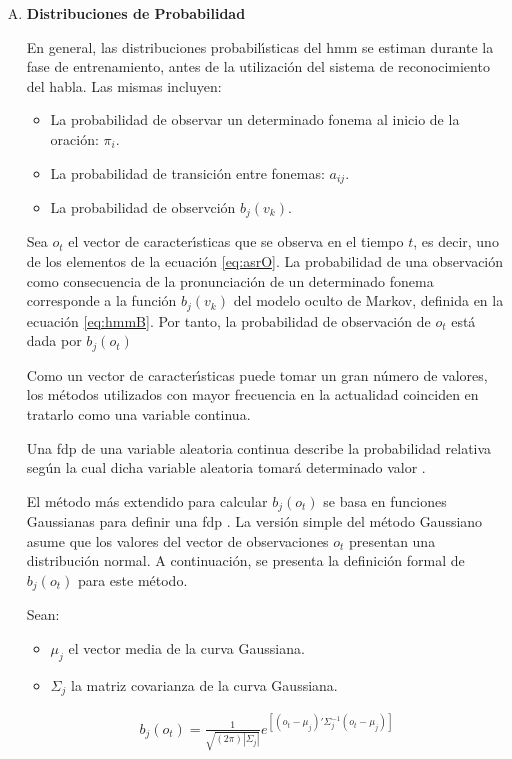 \begin{enumerate}[A)]
	\item \textbf{Distribuciones de Probabilidad}


	En general, las distribuciones probabil{\'\i}sticas del \gls{hmm} se estiman durante la fase de entrenamiento,
	antes de la utilizaci\'on del sistema de reconocimiento del habla. Las mismas incluyen:

	\begin{itemize}
		\item La probabilidad de observar un determinado fonema al inicio de la oraci\'on: $\pi_i$.
		\item La probabilidad de transici\'on entre fonemas: $a_{ij}$.
		\item La probabilidad de observción $b_j(v_k)$. 
	\end{itemize}

	Sea $o_t$ el vector de caracter{\'\i}sticas que se observa en el tiempo $t$, es decir, uno de los elementos
	de la ecuaci\'on \ref{eq:asrO}.
	La probabilidad de una observaci\'on como consecuencia de la pronunciaci\'on de un determinado fonema 
	corresponde a la funci\'on $b_j(v_k)$ del modelo oculto de Markov, definida en la ecuaci\'on \ref{eq:hmmB}.
	Por tanto, la probabilidad de observaci\'on de $o_t$ est\'a dada por $b_j(o_t)$ 

	Como un vector de caracter{\'\i}sticas puede tomar un gran n\'umero de valores, los m\'etodos utilizados con
	mayor frecuencia en la actualidad coinciden en tratarlo como una variable continua.

	Una \gls{fdp} de una variable aleatoria continua describe la probabilidad relativa seg\'un la cual 
	dicha variable aleatoria tomar\'a determinado valor \cite{Evans2011}.

	El m\'etodo m\'as extendido para calcular $b_j(o_t)$ se basa en funciones Gaussianas para definir 
	una \gls{fdp} \cite{Jurafsky}.
	La versi\'{o}n simple del m\'etodo Gaussiano asume que los valores del vector de observaciones $o_t$ presentan una distribuci\'on normal. A continuaci\'on, se presenta la definici\'on formal 
	de $b_j(o_t)$ para este m\'etodo.

	Sean:

	\begin{itemize}
		\item $\mu_j$ el vector media de la curva Gaussiana.
		\item $\Sigma_j$ la matriz covarianza de la curva Gaussiana.
	\end{itemize}

	\begin{align}
    	b_j(o_t) = \frac{1}{\sqrt{(2\pi)|\Sigma_j|}}e^{[(o_t-\mu_j)'\Sigma_j^{-1}(o_t-\mu_j)]}\label{eq:hmmGaussian}
	\end{align}


\end{enumerate}
